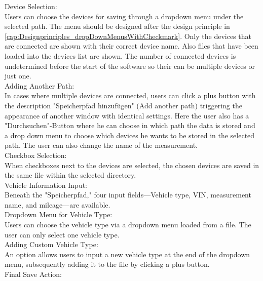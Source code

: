 \documentclass{scrreprt}
\begin{document}
Device Selection:\\

Users can choose the devices for saving through a dropdown menu under the selected path. The menu should be designed after the design principle in \ref{cap:Designprinciples_dropDownMenusWithCheckmark}.
Only the devices that are connected are shown with their correct device name.
Also files that have been loaded into the devices list are shown.
The number of connected devices is undetermined before the start of the software so their can be multiple devices or just one.\\

Adding Another Path:\\

In cases where multiple devices are connected, users can click a plus button with the description "Speicherpfad hinzufügen" (Add another path) triggering the appearance of another window with identical settings. Here the user also has a "Durchsuchen"-Button where he can choose in which path the data is stored and a drop down menu to choose which devices he wants to be stored in the selected path. The user can also change the name of the measurement.\\

Checkbox Selection:\\

When checkboxes next to the devices are selected, the chosen devices are saved in the same file within the selected directory.\\

Vehicle Information Input:\\

Beneath the "Speicherpfad," four input fields—Vehicle type, VIN, measurement name, and mileage—are available.\\

Dropdown Menu for Vehicle Type:\\

Users can choose the vehicle type via a dropdown menu loaded from a file. The user can only select one vehicle type.\\

Adding Custom Vehicle Type:\\

An option allows users to input a new vehicle type at the end of the dropdown menu, subsequently adding it to the file by clicking a plus button.\\

Final Save Action:\\
\end{document}
